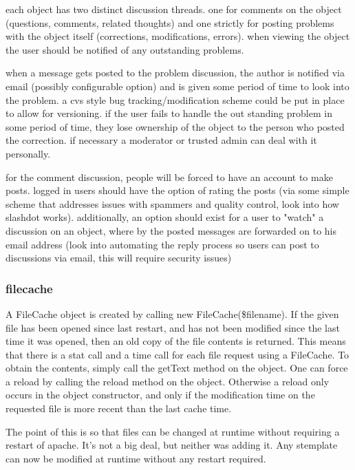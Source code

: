 each object has two distinct discussion threads. one for comments on the object (questions, comments, related thoughts) and one strictly for posting problems with the object itself (corrections, modifications, errors). when viewing the object the user should be notified of any outstanding problems.

when a message gets posted to the problem discussion, the author is notified via email (possibly configurable option) and is given some period of time to look into the problem. a cvs style bug tracking/modification scheme could be put in place to allow for versioning. if the user fails to handle the out standing problem in some period of time, they lose ownership of the object to the person who posted the correction. if necessary a moderator or trusted admin can deal with it personally.

for the comment discussion, people will be forced to have an account to make posts. logged in users should have the option of rating the posts (via some simple scheme that addresses issues with spammers and quality control, look into how slashdot works). additionally, an option should exist for a user to "watch" a discussion on an object, where by the posted messages are forwarded on to his email address (look into automating the reply process so users can post to discussions via email, this will require security issues)

\subsubsection*{filecache}

A FileCache object is created by calling new FileCache(\$filename).  If the
given file has been opened since last restart, and has not been modified
since the last time it was opened, then an old copy of the file contents is
returned.  This means that there is a stat call and a time call for each
file request using a FileCache.  To obtain the contents, simply call the
getText method on the object.  One can force a reload by calling the reload
method on the object.  Otherwise a reload only occurs in the object
constructor, and only if the modification time on the requested file is
more recent than the last cache time.

The point of this is so that files can be changed at runtime without
requiring a restart of apache.  It's not a big deal, but neither was adding
it.  Any stemplate can now be modified at runtime without any restart
required.

